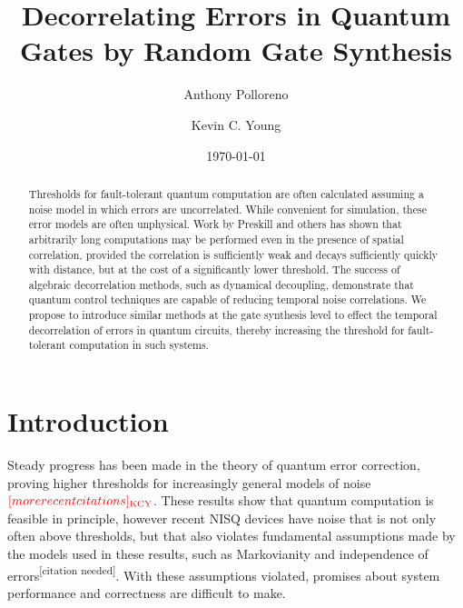 \documentclass[aps,nofootinbib,pra,notitlepage,twocolumn]{revtex4-1}
\newcommand{\needcite}{{\color{blue}\textsuperscript{[citation needed]}}}
\newcommand{\kcy}[1]{{\color{red}[#1]_{\rm{KCY}}}}
\begin{document}
\title{Decorrelating Errors in Quantum Gates by Random Gate Synthesis}

\author{Anthony Polloreno}

\author{Kevin C. Young}

\date{\today}

\begin{abstract}
Thresholds for fault-tolerant quantum computation are often calculated assuming a noise model in which errors are uncorrelated. While convenient for simulation, these error models are often unphysical. Work by Preskill and others has shown that arbitrarily long computations may be performed even in the presence of spatial correlation, provided the correlation is sufficiently weak and decays sufficiently quickly with distance, but at the cost of a significantly lower threshold. The success of algebraic decorrelation methods, such as dynamical decoupling, demonstrate that quantum control techniques are capable of reducing temporal noise correlations. We propose to introduce similar methods at the gate synthesis level to effect the temporal decorrelation of errors in quantum circuits, thereby increasing the threshold for fault-tolerant computation in such systems.
\end{abstract}

\pacs{}

\maketitle

\section{Introduction}

Steady progress has been made in the theory of quantum error correction, proving higher thresholds for increasingly general models of noise \cite{Aharonov2006} $\kcy{more recent citations}$. These results show that quantum computation is feasible in principle, however recent NISQ \cite{Preskill2018} devices have noise that is not only often above thresholds, but that also violates fundamental assumptions made by the models used in these results, such as Markovianity \cite{Kitaev1997} and independence of errors\needcite. With these assumptions violated, promises about system performance and correctness are difficult to make.
\end{document}
